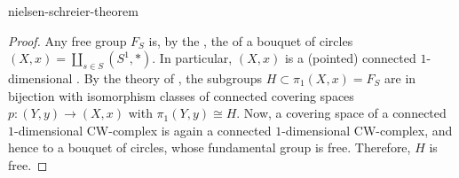 \begin{example}{nielsen-schreier-theorem}
    \begin{proof}
        Any free group $F_S$ is, by the , the  of a bouquet of circles $(X, x) = \coprod_{s \in S} (S^1, *)$. In particular, $(X, x)$ is a (pointed) connected $1$-dimensional . By the theory of , the subgroups $H \subset \pi_1(X, x) = F_S$ are in bijection with isomorphism classes of connected covering spaces $p : (Y, y) \to (X, x)$ with $\pi_1(Y, y) \cong H$. Now, a covering space of a connected $1$-dimensional CW-complex is again a connected $1$-dimensional CW-complex, and hence  to a bouquet of circles, whose fundamental group is free. Therefore, $H$ is free.
    \end{proof}
\end{example}
